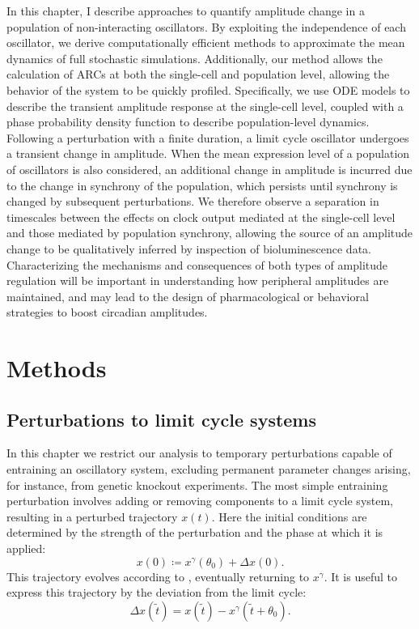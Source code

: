 In this chapter, I describe approaches to quantify amplitude change in a population of non-interacting oscillators.
By exploiting the independence of each oscillator, we derive computationally efficient methods to approximate the mean dynamics of full stochastic simulations.
Additionally, our method allows the calculation of ARCs at both the single-cell and population level, allowing the behavior of the system to be quickly profiled.
Specifically, we use ODE models to describe the transient amplitude response at the single-cell level, coupled with a phase probability density function to describe population-level dynamics.
Following a perturbation with a finite duration, a limit cycle oscillator undergoes a transient change in amplitude.
When the mean expression level of a population of oscillators is also considered, an additional change in amplitude is incurred due to the change in synchrony of the population, which persists until synchrony is changed by subsequent perturbations.
We therefore observe a separation in timescales between the effects on clock output mediated at the single-cell level and those mediated by population synchrony, allowing the source of an amplitude change to be qualitatively inferred by inspection of bioluminescence data.
Characterizing the mechanisms and consequences of both types of amplitude regulation will be important in understanding how peripheral amplitudes are maintained, and may lead to the design of pharmacological or behavioral strategies to boost circadian amplitudes.


\section{Methods}

\subsection{Perturbations to limit cycle systems}

In this chapter we restrict our analysis to temporary perturbations capable of entraining an oscillatory system, excluding permanent parameter changes arising, for instance, from genetic knockout experiments.
The most simple entraining perturbation involves adding or removing components to a limit cycle system, resulting in a perturbed trajectory $x(t)$.
Here the initial conditions are determined by the strength of the perturbation and the phase at which it is applied:
\begin{equation}
  x(0) \coloneqq x^\gamma(\theta_0) + \Delta x(0).
  \label{eq:stateperturbation}
\end{equation}
This trajectory evolves according to , eventually returning to $x^\gamma$.
It is useful to express this trajectory by the deviation from the limit cycle:
\begin{equation}
  \Delta x(\tilde{t}) = x(\tilde{t}) - x^\gamma(\tilde{t} + \theta_0).
  \label{eq:delxt}
\end{equation}

